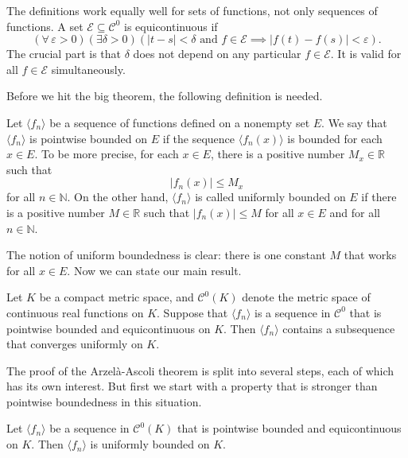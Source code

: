 \documentclass[11pt]{article}
\begin{document}
The definitions work equally well for sets of functions, not only sequences of functions.
A set $\mathcal{E} \subseteq \mathcal{C}^0$ is equicontinuous if
\[
  (\forall\, \varepsilon > 0)(\exists \delta > 0)(|t - s| < \delta \text{ and } f \in \mathcal{E} \implies |f(t) - f(s)| < \varepsilon).
\]
The crucial part is that $\delta$ does not depend on any particular $f \in \mathcal{E}$.
It is valid for all $f \in \mathcal{E}$ simultaneously.

Before we hit the big theorem, the following definition is needed.

\begin{defn}
  Let $\langle f_n \rangle$ be a sequence of functions defined on a nonempty set $E$.
  We say that $\langle f_n \rangle$ is \textsf{pointwise bounded} on $E$ if the sequence $\langle f_n(x) \rangle$ is bounded for each $x \in E$.  To be more precise, for each $x \in E$, there is a positive number $M_x \in \mathbb{R}$ such that 
  \begin{equation} 
    \label{eq:pointwise-bdd}
    | f_n(x) | \leqslant M_x
  \end{equation}
  for all $n \in \mathbb{N}$.
  On the other hand, $\langle f_n \rangle$ is called \textsf{uniformly bounded} on $E$ if there is a positive number $M \in \mathbb{R}$ such that $|f_n(x)| \leqslant M$ for all $x \in E$ and for all $n \in \mathbb{N}$.
\end{defn}

The notion of uniform boundedness is clear: there is one constant $M$ that works for all $x \in E$.
Now we can state our main result.

\begin{thm}
  Let $K$ be a compact metric space, and $\mathcal{C}^0(K)$ denote the metric space of continuous real functions on $K$.
  Suppose that $\langle f_n \rangle$ is a sequence in $\mathcal{C}^0$ that is pointwise bounded and equicontinuous on $K$. Then $\langle f_n \rangle$ contains a subsequence that converges uniformly on $K$.
\end{thm}

The proof of the Arzel\`a-Ascoli theorem is split into several steps, each of which has its own interest.  
But first we start with a property that is stronger than pointwise boundedness in this situation.

\begin{prop}
  Let $\langle f_n \rangle$ be a sequence in $\mathcal{C}^0(K)$ that is pointwise bounded and equicontinuous on $K$.
  Then $\langle f_n \rangle$ is uniformly bounded on $K$.
\end{prop}
\end{document}

